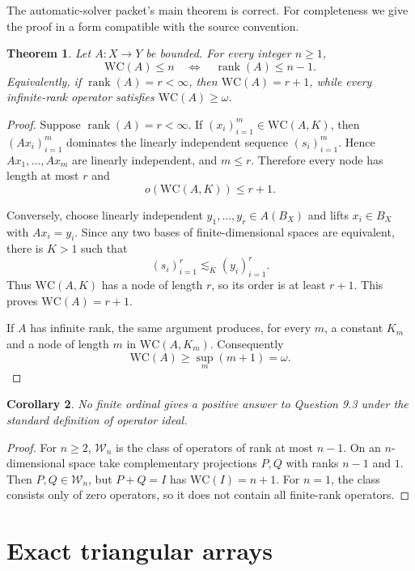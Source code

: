 \documentclass[11pt]{article}
\newtheorem{theorem}{Theorem}[section]
\newtheorem{corollary}[theorem]{Corollary}
\theoremstyle{definition}
\theoremstyle{remark}
\newcommand{\WC}{\mathrm{WC}}
\newcommand{\rank}{\operatorname{rank}}
\newcommand{\cW}{\mathcal W}
\begin{document}
The automatic-solver packet's main theorem is correct.  For completeness we give the proof in a form compatible with the source convention.

\begin{theorem}\label{thm:finite-rank}
Let $A:X\to Y$ be bounded.  For every integer $n\geq1$,
\[
   \WC(A)\leq n
   \quad\Longleftrightarrow\quad
   \rank(A)\leq n-1.
\]
Equivalently, if $\rank(A)=r<\infty$, then $\WC(A)=r+1$, while every infinite-rank operator satisfies $\WC(A)\geq\omega$.
\end{theorem}

\begin{proof}
Suppose $\rank(A)=r<\infty$.  If $(x_i)_{i=1}^m\in\WC(A,K)$, then $(Ax_i)_{i=1}^m$ dominates the linearly independent sequence $(s_i)_{i=1}^m$.  Hence $Ax_1,\dots,Ax_m$ are linearly independent, and $m\leq r$.  Therefore every node has length at most $r$ and
\[
   o(\WC(A,K))\leq r+1.
\]

Conversely, choose linearly independent $y_1,\dots,y_r\in A(B_X)$ and lifts $x_i\in B_X$ with $Ax_i=y_i$.  Since any two bases of finite-dimensional spaces are equivalent, there is $K>1$ such that
\[
   (s_i)_{i=1}^r\lesssim_K(y_i)_{i=1}^r.
\]
Thus $\WC(A,K)$ has a node of length $r$, so its order is at least $r+1$.  This proves $\WC(A)=r+1$.

If $A$ has infinite rank, the same argument produces, for every $m$, a constant $K_m$ and a node of length $m$ in $\WC(A,K_m)$.  Consequently
\[
   \WC(A)\geq\sup_m(m+1)=\omega.
\]
\end{proof}

\begin{corollary}\label{cor:finite-fail}
No finite ordinal gives a positive answer to Question 9.3 under the standard definition of operator ideal.
\end{corollary}

\begin{proof}
For $n\geq2$, $\cW_n$ is the class of operators of rank at most $n-1$.  On an $n$-dimensional space take complementary projections $P,Q$ with ranks $n-1$ and $1$.  Then $P,Q\in\cW_n$, but $P+Q=I$ has $\WC(I)=n+1$.  For $n=1$, the class consists only of zero operators, so it does not contain all finite-rank operators.
\end{proof}

\section{Exact triangular arrays}
\end{document}
